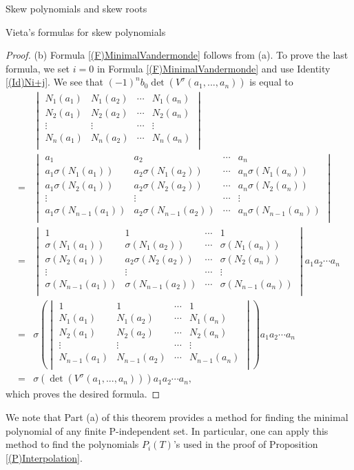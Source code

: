 \documentclass[11pt,a4paper]{article}
\theoremstyle{theorem}
\numberwithin{equation}{section}
\newcommand{\s}{\sigma}
\begin{document}
\begin{section}{Skew polynomials and skew roots}
\begin{subsection}{Vieta's formulas for skew polynomials }
\begin{proof}
	 (b) Formula \ref{(F)MinimalVandermonde} follows from (a). To prove the last formula, we set $i=0$ in Formula \ref{(F)MinimalVandermonde} and use Identity \ref{(Id)Ni+j}. We see that $(-1)^{n}b_0\det \left( V^\s(a_1,...,a_n)\right)$ is equal to
	 \begin{align*}
	 	  & \begin{vmatrix}
	 		N_{1}(a_1)&N_{1}(a_2)&\cdots&N_{1}(a_n)\\
	 		N_{2}(a_1)&N_{2}(a_2)&\cdots&N_{2}(a_n)\\
	 		\vdots&\vdots&\cdots&\vdots\\
	 		N_{n}(a_1)&N_{n}(a_2)&\cdots&N_{n}(a_n)\\
	 	\end{vmatrix}\\
 	=& \begin{vmatrix}
 		a_1&a_2&\cdots&a_n\\
 		a_1\s(N_{1}(a_1))&a_2\s(N_{1}(a_2))&\cdots&a_n\s(N_{1}(a_n))\\
 		a_1\s(N_{2}(a_1))&a_2\s(N_{2}(a_2))&\cdots&a_n\s(N_{2}(a_n))\\
 		\vdots&\vdots&\cdots&\vdots\\
 		a_1\s(N_{n-1}(a_1))&a_2\s(N_{n-1}(a_2))&\cdots&a_n\s(N_{n-1}(a_n))\\
 	\end{vmatrix}\\
 =& \begin{vmatrix}
 	1&1&\cdots&1\\
 	\s(N_{1}(a_1))&\s(N_{1}(a_2))&\cdots&\s(N_{1}(a_n))\\
 	\s(N_{2}(a_1))&a_2\s(N_{2}(a_2))&\cdots&\s(N_{2}(a_n))\\
 	\vdots&\vdots&\cdots&\vdots\\
 	\s(N_{n-1}(a_1))&\s(N_{n-1}(a_2))&\cdots&\s(N_{n-1}(a_n))\\
 \end{vmatrix}a_1a_2\cdots a_n\\
=& \s \left( \begin{vmatrix}
	1&1&\cdots&1\\
	N_{1}(a_1)&N_{1}(a_2)&\cdots&N_{1}(a_n)\\
	N_{2}(a_1)&N_{2}(a_2)&\cdots&N_{2}(a_n)\\
	\vdots&\vdots&\cdots&\vdots\\
	N_{n-1}(a_1)&N_{n-1}(a_2)&\cdots&N_{n-1}(a_n)\\
\end{vmatrix}\right) a_1a_2\cdots a_n\\
=& \s\left( \det \left( V^\s(a_1,...,a_n)\right)\right)  a_1a_2\cdots a_n,
	 \end{align*}
which proves the desired formula. 	 
	 \end{proof}
 We note that Part (a) of this theorem provides a method for finding the minimal polynomial of any finite P-independent set. In particular, one can apply this method to find the polynomials  $P_i(T)$'s used in the proof of Proposition \ref{(P)Interpolation}.  	
	 

\end{subsection}
\end{section}
\end{document}
